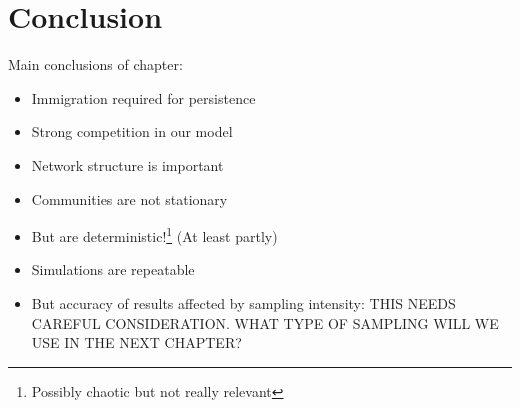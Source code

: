 %
%



\clearpage
\section{Conclusion}
\label{sec:conclusion}

Main conclusions of chapter:

\begin{itemize}
	\item Immigration required for persistence
	\item Strong competition in our model
	\item Network structure is important
	\item Communities are not stationary
	\item But are deterministic!\footnote{Possibly chaotic but not really relevant} (At least partly)
	\item Simulations are repeatable
	\item But accuracy of results affected by sampling intensity: THIS NEEDS CAREFUL CONSIDERATION. WHAT TYPE OF SAMPLING WILL WE USE IN THE NEXT CHAPTER?
\end{itemize}


